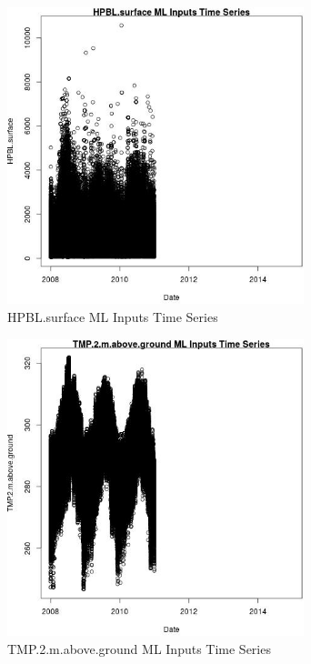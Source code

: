 \begin{figure} 
\centering  
\includegraphics[width=0.77\textwidth]{Code_Outputs/ML_input_report_ML_input_PM25_Step5_part_d_de_duplicated_aves_ML_input_HPBLsurfacevDate.jpg} 
\caption{\label{fig:ML_input_report_ML_input_PM25_Step5_part_d_de_duplicated_aves_ML_inputHPBLsurfacevDate}HPBL.surface ML Inputs Time Series} 
\end{figure} 
 

\clearpage 

\begin{figure} 
\centering  
\includegraphics[width=0.77\textwidth]{Code_Outputs/ML_input_report_ML_input_PM25_Step5_part_d_de_duplicated_aves_ML_input_TMP2mabovegroundvDate.jpg} 
\caption{\label{fig:ML_input_report_ML_input_PM25_Step5_part_d_de_duplicated_aves_ML_inputTMP2mabovegroundvDate}TMP.2.m.above.ground ML Inputs Time Series} 
\end{figure} 
 

